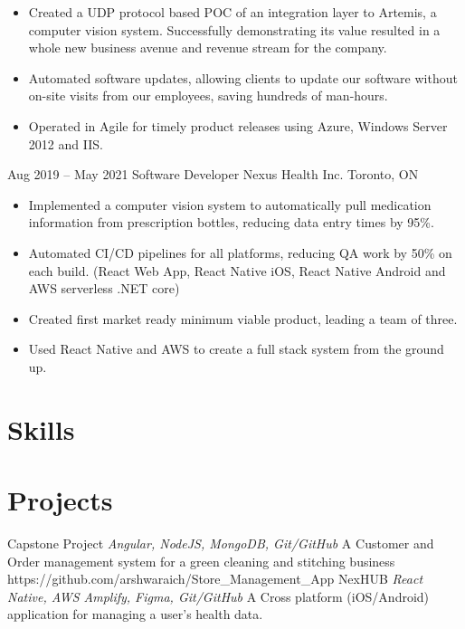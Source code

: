 \documentclass[letterpaper]{moderncv}
\begin{document}
{}
{\begin{itemize}%
	\item Created a UDP protocol based POC of an integration layer to Artemis, a computer vision system. Successfully demonstrating its value resulted in a whole new business avenue and revenue stream for the company.
	\item Automated software updates, allowing clients to update our software without on-site visits from our employees, saving hundreds of man-hours.
	\item Operated in Agile for timely product releases using Azure, Windows Server 2012 and IIS.
	\end{itemize}}
\cventry
{Aug 2019 -- May 2021}
{Software Developer}
{Nexus Health Inc.}
{Toronto, ON}
{}
{\begin{itemize}%
    \item Implemented a computer vision system to automatically pull medication information from prescription bottles, reducing data entry times by 95\%.
    \item Automated CI/CD pipelines for all platforms, reducing QA work by 50\% on each build. (React Web App, React Native iOS, React Native Android and AWS serverless .NET core)
	\item Created first market ready minimum viable product, leading a team of three.
	\item Used React Native and AWS to create a full stack system from the ground up.
	\end{itemize}}
\section{Skills}
\section{Projects}
\cventry
{}
{Capstone Project}
{}
{\textit{Angular, NodeJS, MongoDB, Git/GitHub}}
{}
{A Customer and Order management system for a green cleaning and stitching business\\https://github.com/arshwaraich/Store\_Management\_App}
\vspace{1mm}
\cventry
{}
{NexHUB}
{}
{\textit{React Native, AWS Amplify, Figma, Git/GitHub}}
{}
{A Cross platform (iOS/Android) application for managing a user's health data.}
\vspace{1mm}
\end{document}
